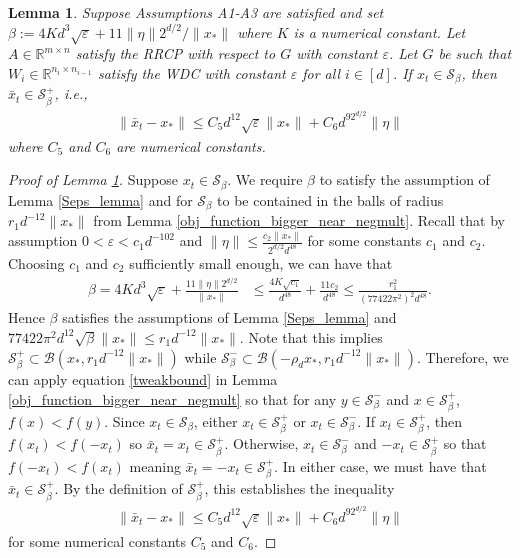 \documentclass[11pt]{article}
\renewcommand{\epsilon}{\varepsilon}
\newcommand{\R}{\mathbb{R}}
\newcommand{\Seps}{\mathcal{S}}
\newcommand{\G}{G}
\newtheorem{lem}{Lemma}
\theoremstyle{remark}
\begin{document}
\begin{lem} \label{conv_to_Sbetaplus_lemma} Suppose Assumptions A1-A3 are satisfied and set $\beta:= 4Kd^3\sqrt{\epsilon} + 11\|\eta\|2^{d/2}/\|x_*\|$ where $K$ is a numerical constant. Let $A \in \R^{m \times n}$ satisfy the RRCP with respect to $\G$ with constant $\epsilon$. Let $\G$ be such that $W_{i} \in \R^{n_i \times n_{i-1}}$ satisfy the WDC with constant $\epsilon$ for all $i \in [d]$. If $x_t \in \mathcal{S}_{\beta}$, then $\bar{x}_t \in \mathcal{S}_{\beta}^+$, i.e., \begin{align*}
    \|\bar{x}_t - x_*\| \leqslant C_5 d^{12}\sqrt{\epsilon}\|x_*\| + C_6 d^92^{d/2}\|\eta\|
\end{align*} where $C_5$ and $C_6$ are numerical constants.
\end{lem}
\begin{proof}[Proof of Lemma \ref{conv_to_Sbetaplus_lemma}]
Suppose $x_t \in \Seps_{\beta}$. We require $\beta$ to satisfy the assumption of Lemma \ref{Seps_lemma} and for $\Seps_{\beta}$ to be contained in the balls of radius $r_1d^{-12}\|x_*\|$ from Lemma \ref{obj_function_bigger_near_negmult}. Recall that by assumption $0 < \epsilon < c_1 d^{-102}$ and $\|\eta\| \leqslant \frac{c_2\|x_*\|}{2^{d/2}d^{48}}$ for some constants $c_1$ and $c_2$. Choosing $c_1$ and $c_2$ sufficiently small enough, we can have that \begin{align}
    \beta  = 4K d^3 \sqrt{\epsilon} + \frac{11\|\eta\|2^{d/2}}{\|x_*\|} & \leqslant \frac{4K\sqrt{c_1}}{d^{48}}+ \frac{11c_2}{d^{48}}  \leqslant\frac{r_1^2}{(77422\pi^2)^2d^{48}}. \nonumber
\end{align} Hence $\beta$ satisfies the assumptions of Lemma \ref{Seps_lemma} and $77422\pi^2d^{12}\sqrt{\beta}\|x_*\| \leqslant r_1d^{-12}\|x_*\|.$ Note that this implies $\Seps_{\beta}^+ \subset \mathcal{B}(x_*,r_1d^{-12}\|x_*\|)$ while $\Seps_{\beta}^- \subset \mathcal{B}(-\rho_d x_*,r_1d^{-12}\|x_*\|)$. Therefore, we can apply equation \eqref{tweakbound} in Lemma \ref{obj_function_bigger_near_negmult} so that for any $y \in \Seps_{\beta}^-$ and $x \in \Seps_{\beta}^+$, $f(x) < f(y)$. Since $x_t \in \Seps_{\beta}$, either $x_t \in \Seps_{\beta}^+$ or $x_t \in \Seps_{\beta}^-$. If $x_t \in \Seps_{\beta}^+$, then $f(x_t) < f(-x_t)$ so $\bar{x}_t = x_t \in \Seps_{\beta}^+$. Otherwise, $x_t \in \Seps_{\beta}^-$ and $-x_t \in \Seps_{\beta}^+$ so that $f(-x_t) < f(x_t)$ meaning $\bar{x}_t = -x_t \in \Seps_{\beta}^+$. In either case, we must have that $\bar{x}_t \in \Seps_{\beta}^+$. By the definition of $\Seps_{\beta}^+$, this establishes the inequality \begin{align*}
    \|\bar{x}_t - x_*\| \leqslant C_5 d^{12}\sqrt{\epsilon}\|x_*\| + C_6 d^92^{d/2}\|\eta\|
\end{align*} for some numerical constants $C_5$ and $C_6$.


\end{proof}
\end{document}
